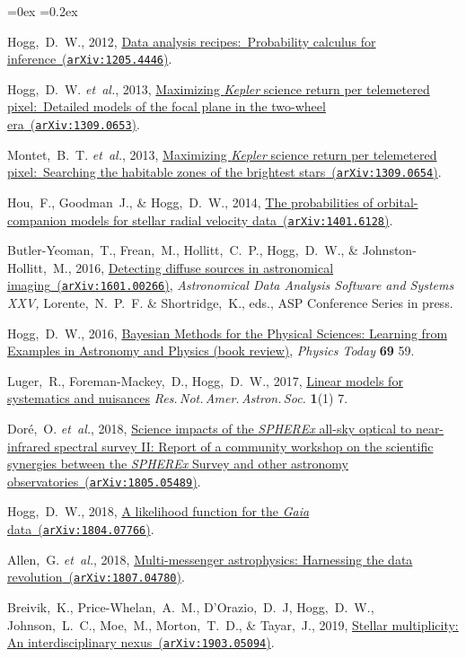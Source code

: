 \documentclass[12pt,letterpaper]{article}
\newcommand{\latin}[1]{\textsl{#1}}
\newcommand{\etal}{\latin{et~al.}}
\newcommand{\satellite}[1]{\textsl{#1}}
\newcommand{\project}[1]{\textsl{#1}}
\newcommand{\doi}[2]{\href{http://dx.doi.org/#1}{{#2}}}
\newcommand{\arxiv}[2]{\href{http://arxiv.org/abs/#1}{{#2}\ (\texttt{arXiv:#1})}}
\newcounter{refpubnum}
\newcommand{\hogglist}{%
    \rightmargin=0in
    \leftmargin=0.18in
    \topsep=0ex
    \partopsep=0pt
    \itemsep=0.2ex
    \parsep=0pt
    \itemindent=-1.0\leftmargin
    \listparindent=0.0\leftmargin
    \settowidth{\labelsep}{~}
    \usecounter{refpubnum}
  }
\begin{document}
\begin{list}{}{\hogglist}
\item
Hogg,~D.~W., 2012,
\arxiv{1205.4446}{Data analysis recipes:\ Probability calculus for inference}.
\item
Hogg,~D.~W. \etal, 2013,
\arxiv{1309.0653}{Maximizing \satellite{Kepler} science return per telemetered pixel:\ Detailed models of the focal plane in the two-wheel era}.
\item
Montet,~B.~T. \etal, 2013,
\arxiv{1309.0654}{Maximizing \satellite{Kepler} science return per telemetered pixel:\ Searching the habitable zones of the brightest stars}.
\item
Hou,~F., Goodman~J., \& Hogg,~D.~W., 2014,
\arxiv{1401.6128}{The probabilities of orbital-companion models for stellar radial velocity data}.
\item
Butler-Yeoman,~T., Frean,~M., Hollitt,~C.~P., Hogg,~D.~W., \& Johnston-Hollitt,~M., 2016,
\arxiv{1601.00266}{Detecting diffuse sources in astronomical imaging},
\textit{Astronomical Data Analysis Software and Systems XXV,} 
Lorente,~N.~P.~F. \& Shortridge,~K., eds., 
ASP Conference Series in press. %
\item
Hogg,~D.~W., 2016,
\doi{10.1063/PT.3.3200}{Bayesian Methods for the Physical Sciences: Learning from Examples in Astronomy and Physics (book review)},
\textit{Physics Today} \textbf{69} 59.
\item
Luger,~R., Foreman-Mackey,~D., Hogg,~D.~W., 2017,
\doi{10.3847/2515-5172/aa96b5}{Linear models for systematics and nuisances}
\textit{Res.\,Not.\,Amer.\,Astron.\,Soc.} \textbf{1}(1) 7.
\item
Dor\'e,~O. \etal, 2018,
\arxiv{1805.05489}{Science impacts of the \project{SPHEREx} all-sky optical to near-infrared spectral survey II: Report of a community workshop on the scientific synergies between the \project{SPHEREx} Survey and other astronomy observatories}.
\item
Hogg,~D.~W., 2018,
\arxiv{1804.07766}{A likelihood function for the \project{Gaia} data}.
\item
Allen,~G. \etal, 2018,
\arxiv{1807.04780}{Multi-messenger astrophysics: Harnessing the data revolution}.
\item
Breivik,~K., Price-Whelan,~A.~M., D'Orazio,~D.~J, Hogg,~D.~W., Johnson,~L.~C., Moe,~M., Morton,~T.~D.,
\& Tayar,~J., 2019,
\arxiv{1903.05094}{Stellar multiplicity: An interdisciplinary nexus}.
\end{list}
\end{document}
